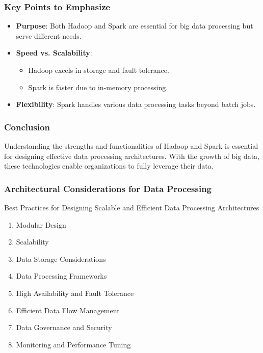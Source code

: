 \documentclass[aspectratio=169]{beamer}
\begin{document}
\begin{frame}[fragile]
    \frametitle{Key Points to Emphasize}
    \begin{itemize}
        \item \textbf{Purpose}: Both Hadoop and Spark are essential for big data processing but serve different needs.
        \item \textbf{Speed vs. Scalability}: 
            \begin{itemize}
                \item Hadoop excels in storage and fault tolerance.
                \item Spark is faster due to in-memory processing.
            \end{itemize}
        \item \textbf{Flexibility}: Spark handles various data processing tasks beyond batch jobs.
    \end{itemize}
\end{frame}

\begin{frame}[fragile]
    \frametitle{Conclusion}
    Understanding the strengths and functionalities of Hadoop and Spark is essential for designing effective data processing architectures. With the growth of big data, these technologies enable organizations to fully leverage their data.
\end{frame}

\begin{frame}[fragile]
    \frametitle{Architectural Considerations for Data Processing}
    \begin{block}{Best Practices for Designing Scalable and Efficient Data Processing Architectures}
        \begin{enumerate}
            \item Modular Design
            \item Scalability
            \item Data Storage Considerations
            \item Data Processing Frameworks
            \item High Availability and Fault Tolerance
            \item Efficient Data Flow Management
            \item Data Governance and Security
            \item Monitoring and Performance Tuning
        \end{enumerate}
    \end{block}
\end{frame}
\end{document}
